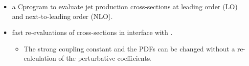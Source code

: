 \begin{frame}
\begin{itemize}
\ball
\item {\scriptsize \mycolor{\NLOJET~:} a C\plusn\plus program to evaluate jet production cross-sections at leading order (LO) and next-to-leading order (NLO).\\}
\tri
{}
\ball
\item {\scriptsize \mycolor{\fastNLO :} fast re-evaluations of cross-sections in interface with \NLOJETPPn. \\}
\tri
\begin{itemize}
\item {\scriptsize The strong coupling constant and the PDFs can be changed without a re-calculation of the perturbative coefficients.\\}
\end{itemize}
\ball
\end{itemize}
\end{frame}


